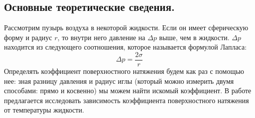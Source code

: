\documentclass[a4paper,12pt]{report}
\begin{document}
    \begin{multicols}{2}
        \section{Основные теоретические сведения.}
        Рассмотрим пузырь воздуха в некоторой жидкости. Если он имеет сферическую форму и радиус $r$, то внутри него давление на $\Delta p$ выше, чем в жидкости. $\Delta p$ находится из следующего соотношения, которое называется формулой Лапласа:
        \begin{equation}
            \Delta p = \frac{2\sigma}{r}
        \end{equation}
        Определять коэффициент поверхностного натяжения будем как раз с помощью нее: зная разницу давления и радиус иглы (который можно измерить двумя способами: прямо и косвенно) мы можем найти искомый коэффициент. В работе предлагается исследовать зависимость коэффициента поверхностного натяжения от температуры жидкости.

\end{multicols}
\end{document}
